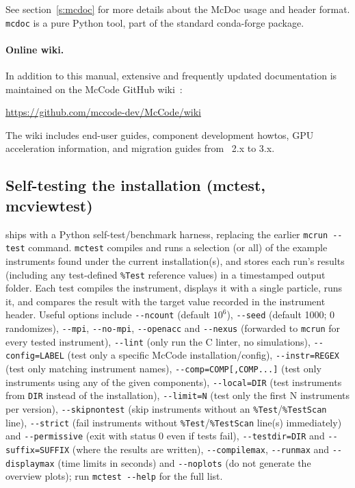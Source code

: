 See section~\ref{s:mcdoc} for more details about the McDoc usage and header
format.  \verb+mcdoc+ is a pure Python tool, part of the standard \MCS
conda-forge package.

\paragraph{Online wiki.}
In addition to this manual, extensive and frequently updated documentation
is maintained on the McCode GitHub wiki~\cite{Wiki}:
\begin{center}
  \url{https://github.com/mccode-dev/McCode/wiki}
\end{center}
The wiki includes end-user guides, component development howtos, GPU
acceleration information, and migration guides from \MCS~2.x to 3.x.


\subsection{Self-testing the installation (mctest, mcviewtest)}
\label{s:mctest}

\MCS ships with a Python self-test/benchmark harness, replacing the earlier
\verb+mcrun --test+ command. \verb+mctest+ compiles and runs a selection (or
all) of the example instruments found under the current installation(s), and
stores each run's results (including any test-defined \texttt{\%Test}
reference values) in a timestamped output folder. Each test compiles the
instrument, displays it with a single particle, runs it, and compares the
result with the target value recorded in the instrument header. Useful options
include \verb+--ncount+ (default $10^6$), \verb+--seed+ (default 1000; 0
randomizes), \verb+--mpi+, \verb+--no-mpi+, \verb+--openacc+ and \verb+--nexus+
(forwarded to \verb+mcrun+ for every tested instrument), \verb+--lint+ (only
run the C linter, no simulations), \verb+--config=LABEL+ (test only a specific
McCode installation/config), \verb+--instr=REGEX+ (test only matching
instrument names), \verb+--comp=COMP[,COMP...]+ (test only instruments using
any of the given components), \verb+--local=DIR+ (test instruments from
\texttt{DIR} instead of the installation), \verb+--limit=N+ (test only the first
N instruments per version), \verb+--skipnontest+ (skip instruments without an
\texttt{\%Test}/\texttt{\%TestScan} line), \verb+--strict+ (fail instruments without
\texttt{\%Test}/\texttt{\%TestScan} line(s) immediately) and \verb+--permissive+ (exit with
status 0 even if tests fail), \verb+--testdir=DIR+ and \verb+--suffix=SUFFIX+
(where the results are written), \verb+--compilemax+, \verb+--runmax+ and
\verb+--displaymax+ (time limits in seconds) and \verb+--noplots+ (do not
generate the overview plots); run \verb+mctest --help+ for the full list.

